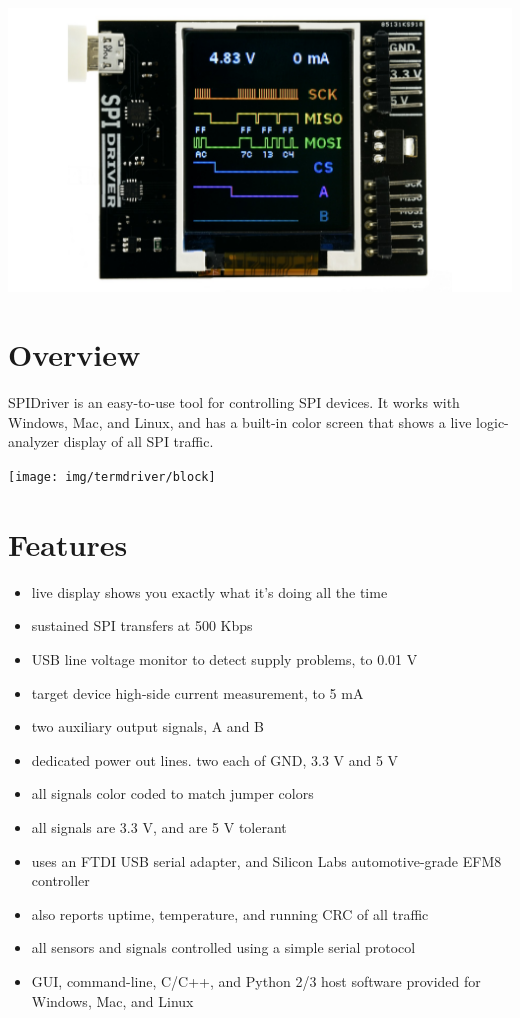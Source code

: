 \documentclass{article}
\begin{document}
\newpage
\begin{center}
\includegraphics[width=1.00\textwidth]{img/spidriver/main}
\end{center}
\tableofcontents
\listoffigures

\section{Overview}

SPIDriver is an easy-to-use tool for controlling SPI devices. It works with Windows, Mac, and Linux, and has a built-in color screen that shows a live logic-analyzer display of all SPI traffic.

\begin{center}
\texttt{[image: img/termdriver/block]}
\end{center}

\section{Features}
\begin{itemize}
\item live display shows you exactly what it’s doing all the time
\item sustained SPI transfers at 500 Kbps
\item USB line voltage monitor to detect supply problems, to 0.01 V
\item target device high-side current measurement, to 5 mA
\item two auxiliary output signals, A and B
\item dedicated power out lines. two each of GND, 3.3 V and 5 V
\item all signals color coded to match jumper colors
\item all signals are 3.3 V, and are 5 V tolerant
\item uses an FTDI USB serial adapter, and Silicon Labs automotive-grade EFM8 controller
\item also reports uptime, temperature, and running CRC of all traffic
\item all sensors and signals controlled using a simple serial protocol
\item GUI, command-line, C/C++, and Python 2/3 host software provided for Windows, Mac, and Linux
\end{itemize}
\end{document}
